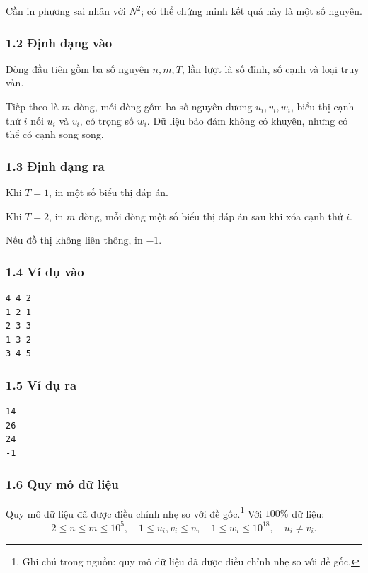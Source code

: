 \documentclass[11pt]{article}
\begin{document}
Cần in phương sai nhân với \(N^2\); có thể chứng minh kết quả này là một số
nguyên.

\subsubsection*{1.2 Định dạng vào}

Dòng đầu tiên gồm ba số nguyên \(n,m,T\), lần lượt là số đỉnh, số cạnh và loại
truy vấn.

Tiếp theo là \(m\) dòng, mỗi dòng gồm ba số nguyên dương \(u_i,v_i,w_i\), biểu
thị cạnh thứ \(i\) nối \(u_i\) và \(v_i\), có trọng số \(w_i\). Dữ liệu bảo đảm
không có khuyên, nhưng có thể có cạnh song song.

\subsubsection*{1.3 Định dạng ra}

Khi \(T=1\), in một số biểu thị đáp án.

Khi \(T=2\), in \(m\) dòng, mỗi dòng một số biểu thị đáp án sau khi xóa cạnh
thứ \(i\).

Nếu đồ thị không liên thông, in \(-1\).

\subsubsection*{1.4 Ví dụ vào}

\begin{verbatim}
4 4 2
1 2 1
2 3 3
1 3 2
3 4 5
\end{verbatim}

\subsubsection*{1.5 Ví dụ ra}

\begin{verbatim}
14
26
24
-1
\end{verbatim}

\subsubsection*{1.6 Quy mô dữ liệu}

Quy mô dữ liệu đã được điều chỉnh nhẹ so với đề gốc.\footnote{Ghi chú trong
nguồn: quy mô dữ liệu đã được điều chỉnh nhẹ so với đề gốc.} Với \(100\%\) dữ
liệu:
\[
  2\le n\le m\le 10^5,\quad 1\le u_i,v_i\le n,\quad
  1\le w_i\le 10^{18},\quad u_i\ne v_i.
\]
\end{document}
